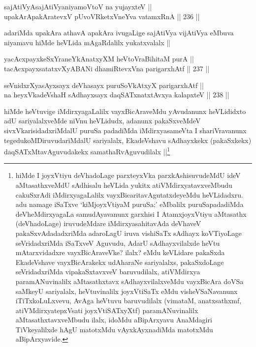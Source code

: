 \begin{shl}
sajAtiVyAsajAtiVyaniyamoV\s toV na yujayxteV || \\
upakArApakAratevxV pUvoVRketxVneYva vatamxRnA ||  236 ||  
\end{shl}

\begin{artha}
adariMda upakAra athavA apakAra ivugaLige sajAtiVya vijAtiVya eMbuva niyamavu hiMde heVLida mAgaRdalilx yukatxvalalx ||
\end{artha}

\begin{shl}
yacAcxpayxkeSxYraneYkAnatxyXM heVtoVraBihitaM purA || \\
tacAcxpayxsatatxvXyA\s BANi dhamiRtevxVna parigarxhAtf ||  237 ||  
\end{shl}
				
\begin{shl}
seVnidxrXyasAyxsayx deVhasayx puruSoVkAtxyX parigarxhAtf || \\
na heyxVkadeVshaH sAdhayxsayx daqSATxnatxtAvxya kalapxteV ||  238 ||  
\end{shl}

\begin{artha}
hiMde heVtuvige iMdirxyagaLalilx vayxBicAraveMdu yAvudanunx heVLididxto adU sariyalalxveMde niVnu heVLidudx, adanunx pakaSxveMdeV sivxVkarisidadxriMdalU puruSa padadiMda iMdirxyasameVta I shariVravanunx tegedukoMDiruvudariMdalU sariyalalx, EkadeVshavu sAdhayxkekx (pakaSxkekx) daqSATxMtavAguvudakekx samathaRvAguvudilalx ||\footnote{hiMde I joyxVtiyu deVhadoLage parxteyxVka parxkAshisuvudeMdU ideV aMtasathxveMdU sAdhisalu heVLida yukitx atiVMdirxyatavxveMbudu cakuSxrAdi iMdirxyagaLalilx vayxBicaritavAgutatxdeyeMdu heVLidadxru. adu namage iSaTxve `kiMjoyxVtiyaM puruSa;' eMbalilx puruSapadadiMda deVheMdirxyagaLa samudAyavanunx garxhisi I AtamxjoyxVtiyu aMtasathx (deVhadoLage) iruvudeMdare iMdirxyasahitavAda deVhaveV pakaSxvAdadadxriMda adaroLagU iruva vishiSaTx sAdhayx koVTiyoLage seVridadxriMda iSaTxveV Aguvudu, AdarU sAdhayxvilalxde heVtu mAtarxvidadxre vayxBicAraveVke? ilalx? eMdu keVLidare pakaSxda EkadeVshave vayxBicArakekx udAharaNe sariyalalxs, pakaSxdoLage seVridadxriMda vipakaSxtavxveV baruvudilalx, atiVMdirxya paramANuvinalilx aMtasathxtavx sAdhayxvilalxveMdu vayxBicAra doVSa saMkeyU sariyalalx, heVtuvinalilx joyxVtiSaTx eMdu visheVSaNavanunx iTiTxkoLuLxvevu, AvAga heVtuvu baruvudilalx (vimataM, anatxsathxmf, atiVMdirxyatepxVsati joyxVtiSATxyXtf) paramANuvinalilx aMtasathxtavxveMbudu ilalx, idoMdu aBipArxyavu AnaMdagiri TiVkeyalilxde hAgU matotxMdu vAyxkAyxnadiMda matotxMdu aBipArxyavide.} 
\end{artha}

